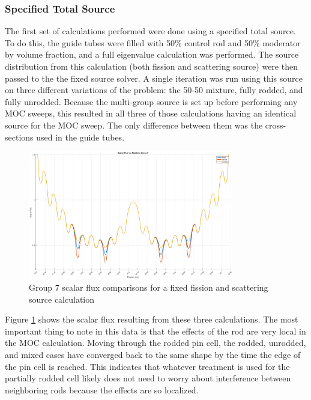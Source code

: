 \subsubsection{Specified Total Source}

The first set of calculations performed were done using a specified total source.  To do this, the guide tubes were filled with 50\% control rod and 50\% moderator by volume fraction, and a full eigenvalue calculation was performed.  The source distribution from this calculation (both fission and scattering source) were then passed to the the fixed source solver.  A single iteration was run using this source on three different variations of the problem: the 50-50 mixture, fully rodded, and fully unrodded.  Because the multi-group source is set up before performing any MOC sweeps, this resulted in all three of those calculations having an identical source for the MOC sweep.  The only difference between them was the cross-sections used in the guide tubes.

\begin{figure}[h]
    \centering
    \includegraphics[width=0.8\textwidth]{../figs/1dmoc-50mix-fixedscat-scalflux7.png}
    \caption{Group 7 scalar flux comparisons for a fixed fission and scattering source calculation}\label{f:1dmoc-fixed-50-scalflux7}
\end{figure}

Figure \ref{f:1dmoc-fixed-50-scalflux7} shows the scalar flux resulting from these three calculations.  The most important thing to note in this data is that the effects of the rod are very local in the MOC calculation.  Moving through the rodded pin cell, the rodded, unrodded, and mixed cases have converged back to the same shape by the time the edge of the pin cell is reached.  This indicates that whatever treatment is used for the partially rodded cell likely does not need to worry about interference between neighboring rods because the effects are so localized.

